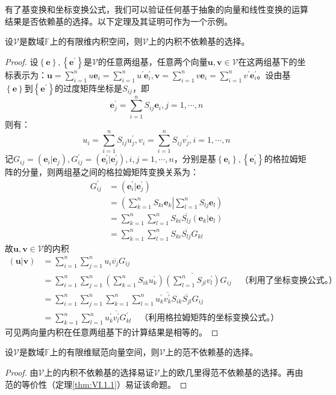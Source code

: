 \documentclass[main.tex]{subfiles}
\begin{document}
有了基变换和坐标变换公式，我们可以验证任何基于抽象的向量和线性变换的运算结果是否依赖基的选择。以下定理及其证明可作为一个示例。

\begin{theorem}\label{thm:II.5.3}
设$\mathcal{V}$是数域$\mathbb{F}$上的有限维内积空间，则$\mathcal{V}$上的内积不依赖基的选择。
\end{theorem}
\begin{proof}
设$\left\{\mathbf{e}\right\},\left\{\mathbf{e}^\prime\right\}$是$\mathcal{V}$的任意两组基，任意两个向量$\mathbf{u},\mathbf{v}\in\mathcal{V}$在这两组基下的坐标表示为：$\mathbf{u}=\sum_{i=1}^nu\mathbf{e}_i=\sum_{i=1}^nu^\prime\mathbf{e}^\prime_i,\mathbf{v}=\sum_{i=1}^nv\mathbf{e}_i=\sum_{i=1}^nv^\prime\mathbf{e}^\prime_i$。设由基$\left\{\mathbf{e}\right\}$到$\left\{\mathbf{e}^\prime\right\}$的过度矩阵坐标是$S_{ij}$，即
\[
\mathbf{e}_j^\prime=\sum_{i=1}^nS_{ij}\mathbf{e}_i,j=1,\cdots,n\]
则有：
\[u_i=\sum_{i=1}^nS_{ij}u^\prime_j,v_i=\sum_{i=1}^nS_{ij}v^\prime_j,i=1,\cdots,n\]
记$G_{ij}=\left(\mathbf{e}_i|\mathbf{e}_j\right),G_{ij}^\prime=\left(\mathbf{e}^\prime_i|\mathbf{e}^\prime_j\right),i,j=1,\cdots,n$，分别是基$\left\{\mathbf{e}_i\right\},\left\{\mathbf{e}^\prime_i\right\}$的格拉姆矩阵的分量，则两组基之间的格拉姆矩阵变换关系为：
\begin{align*}
    G^\prime_{ij}&=\left(\mathbf{e}^\prime_i|\mathbf{e}^\prime_j\right)\\
    &=\left(\sum_{k=1}^n S_{ki}\mathbf{e}_k\right|\left.\sum_{l=1}^n S_{lj}\mathbf{e}_l\right)\\
    &=\sum_{k=1}^n\sum_{l=1}^nS_{ki}\overline{S_{lj}}\left(\mathbf{e}_k|\mathbf{e}_l\right)\\
    &=\sum_{k=1}^n\sum_{l=1}^nS_{ki}\overline{S_{lj}}G_{kl}
\end{align*}
故$\mathbf{u},\mathbf{v}\in\mathcal{V}$的内积
\begin{align*}
    \left(\mathbf{u}|\mathbf{v}\right)&=\sum_{i=1}^n\sum_{j=1}^nu_i\overline{v_j}G_{ij}\\
    &=\sum_{i=1}^n\sum_{j=1}^n\left(\sum_{k=1}^nS_{ik}u_k^\prime\right)\overline{\left(\sum_{l=1}^nS_{jl}v_l^\prime\right)}G_{ij}\quad\text{（利用了坐标变换公式。）}\\
    &=\sum_{i=1}^n\sum_{j=1}^n\sum_{k=1}^n\sum_{l=1}^nu_k^\prime\overline{v_k^\prime}S_{ik}\overline{S_{jl}}G_{ij}\\
    &=\sum_{k=1}^n\sum_{l=1}^nu_k^\prime\overline{v_l^\prime}G_{kl}^\prime\quad\text{（利用格拉姆矩阵的坐标变换公式。）}
\end{align*}
可见两向量内积在任意两组基下的计算结果是相等的。
\end{proof}
\begin{corollary}
设$\mathcal{V}$是数域$\mathbb{F}$上的有限维赋范向量空间，则$\mathcal{V}$上的范不依赖基的选择。
\end{corollary}
\begin{proof}
由$\mathcal{V}$上的内积不依赖基的选择易证$\mathcal{V}$上的欧几里得范不依赖基的选择。再由范的等价性（定理\ref{thm:VI.1.1}）易证该命题。
\end{proof}
\end{document}
